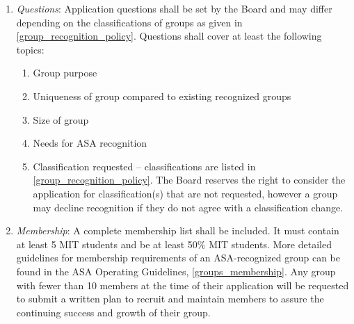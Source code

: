 \documentclass[12pt]{article}
\begin{document}
\begin{enumerate}
    \item \textit{Questions}: Application questions shall be set by the Board and may differ depending on the
        classifications of groups as given in \ref{group_recognition_policy}.
    Questions shall cover at least the following topics:
    \begin{enumerate}
        \item Group purpose
        \item Uniqueness of group compared to existing recognized groups
        \item Size of group
        \item Needs for ASA recognition
        \item Classification requested -- classifications are listed in \ref{group_recognition_policy}.
        The Board reserves the right to consider the application for classification(s) that are not requested,
            however a group may decline recognition if they do not agree with a classification change.
    \end{enumerate}

    \item \textit{Membership}: A complete membership list shall be included.
    It must contain at least 5 MIT students and be at least 50\% MIT students.
    More detailed guidelines for membership requirements of an ASA-recognized group can be found in the
        ASA Operating Guidelines, \ref{groups_membership}.
    Any group with fewer than 10 members at the time of their application will be
        requested to submit a written plan to recruit and maintain members to assure the continuing
        success and growth of their group.


\end{enumerate}
\end{document}

